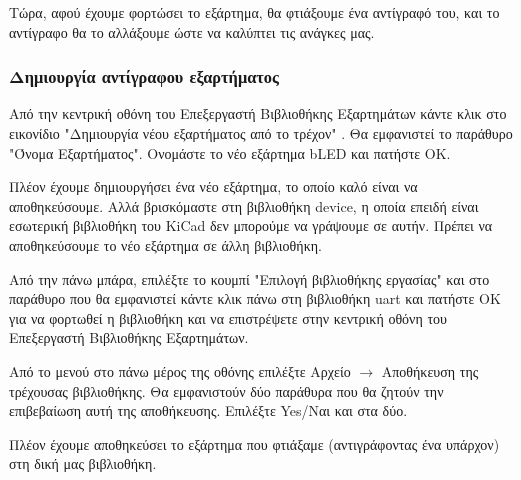 \documentclass[a4paper]{article}
\begin{document}
\begin{figure}
  \begin{center}
    \label{fig:kicad-main}
  \end{center}
\end{figure}

Τώρα, αφού έχουμε φορτώσει το εξάρτημα, θα φτιάξουμε ένα αντίγραφό του, και το αντίγραφο θα το αλλάξουμε ώστε να καλύπτει τις ανάγκες μας.

\subsubsection{Δημιουργία αντίγραφου εξαρτήματος}

Από την κεντρική οθόνη του Επεξεργαστή Βιβλιοθήκης Εξαρτημάτων κάντε κλικ στο εικονίδιο "Δημιουργία νέου εξαρτήματος από το τρέχον" %
. Θα εμφανιστεί το παράθυρο "Όνομα Εξαρτήματος". Ονομάστε το νέο εξάρτημα b\textenglish{LED} και πατήστε ΟΚ.

\begin{figure}
  \begin{center}
    \label{fig:kicad-main}
  \end{center}
\end{figure}

Πλέον έχουμε δημιουργήσει ένα νέο εξάρτημα, το οποίο καλό είναι να αποθηκεύσουμε. Αλλά βρισκόμαστε στη βιβλιοθήκη device, η οποία επειδή είναι εσωτερική βιβλιοθήκη του \textenglish{KiCad} δεν μπορούμε να γράψουμε σε αυτήν. Πρέπει να αποθηκεύσουμε το νέο εξάρτημα σε άλλη βιβλιοθήκη.

Από την πάνω μπάρα, επιλέξτε το κουμπί "Επιλογή βιβλιοθήκης εργασίας" %
 και στο παράθυρο που θα εμφανιστεί κάντε κλικ πάνω στη βιβλιοθήκη uart και πατήστε ΟΚ για να φορτωθεί η βιβλιοθήκη και να επιστρέψετε στην κεντρική οθόνη του Επεξεργαστή Βιβλιοθήκης Εξαρτημάτων.

Από το μενού στο πάνω μέρος της οθόνης επιλέξτε Αρχείο $\rightarrow$ Αποθήκευση της τρέχουσας βιβλιοθήκης. Θα εμφανιστούν δύο παράθυρα που θα ζητούν την επιβεβαίωση αυτή της αποθήκευσης. Επιλέξτε Yes/Ναι και στα δύο.

Πλέον έχουμε αποθηκεύσει το εξάρτημα που φτιάξαμε (αντιγράφοντας ένα υπάρχον) στη δική μας βιβλιοθήκη.
\end{document}
